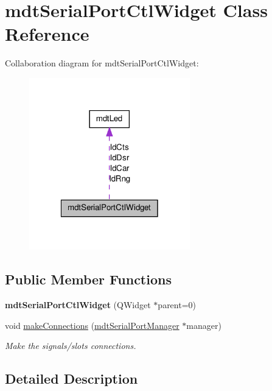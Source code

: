 \hypertarget{classmdt_serial_port_ctl_widget}{
\section{mdtSerialPortCtlWidget Class Reference}
\label{classmdt_serial_port_ctl_widget}
}


Collaboration diagram for mdtSerialPortCtlWidget:\nopagebreak
\begin{figure}[H]
\begin{center}
\leavevmode
\includegraphics[width=198pt]{classmdt_serial_port_ctl_widget__coll__graph}
\end{center}
\end{figure}
\subsection*{Public Member Functions}
\begin{DoxyCompactItemize}
\item 
\hypertarget{classmdt_serial_port_ctl_widget_ae2fac54a22a572b5f3348322a27cced9}{
{\bfseries mdtSerialPortCtlWidget} (QWidget $\ast$parent=0)}
\label{classmdt_serial_port_ctl_widget_ae2fac54a22a572b5f3348322a27cced9}

\item 
void \hyperlink{classmdt_serial_port_ctl_widget_a9dce60a846cbf24d7ceab099ff147c18}{makeConnections} (\hyperlink{classmdt_serial_port_manager}{mdtSerialPortManager} $\ast$manager)
\begin{DoxyCompactList}\small\item\em Make the signals/slots connections. \end{DoxyCompactList}\end{DoxyCompactItemize}


\subsection{Detailed Description}


